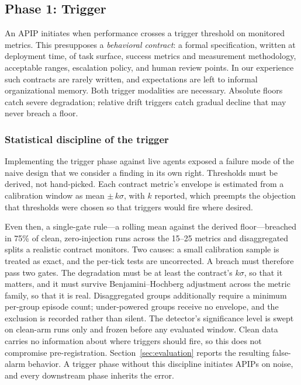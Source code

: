 \documentclass[conference]{IEEEtran}
\begin{document}
\subsection{Phase 1: Trigger}
\label{sec:trigger}

An APIP initiates when performance crosses a trigger threshold on monitored
metrics. This presupposes a \emph{behavioral contract}: a formal specification,
written at deployment time, of task surface, success metrics and measurement
methodology, acceptable ranges, escalation policy, and human review points. In
our experience such contracts are rarely written, and expectations are left to
informal organizational memory.
Both trigger modalities are necessary. Absolute floors catch severe
degradation; relative drift triggers catch gradual decline that may never
breach a floor.

\subsubsection{Statistical discipline of the trigger}
Implementing the trigger phase against live agents exposed a failure mode of
the naive design that we consider a finding in its own right. Thresholds must
be derived, not hand-picked. Each contract metric's envelope is estimated from
a calibration window as mean $\pm\,k\sigma$, with $k$ reported, which preempts
the objection that thresholds were chosen so that triggers would fire where
desired.

Even then, a single-gate rule---a rolling mean against the derived
floor---breached in 75\% of clean, zero-injection runs across the 15--25
metrics and disaggregated splits a realistic contract monitors.
Two causes: a small calibration sample is treated as exact, and the per-tick
tests are uncorrected. A breach must therefore pass two gates. The degradation
must be at least the contract's $k\sigma$, so that it matters, and it must
survive Benjamini--Hochberg adjustment across the metric family, so that it is
real. Disaggregated groups additionally require a minimum per-group episode
count; under-powered groups receive no envelope, and the exclusion is recorded
rather than silent. The detector's significance level is swept on clean-arm
runs only and frozen before any evaluated window. Clean data carries no
information about where triggers should fire, so this does not compromise
pre-registration. Section~\ref{sec:evaluation} reports the resulting
false-alarm behavior. A trigger phase without this discipline initiates APIPs
on noise, and every downstream phase inherits the error.
\end{document}

